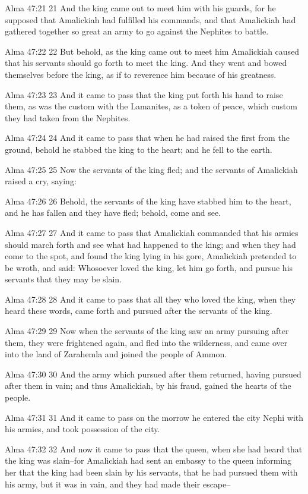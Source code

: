 Alma 47:21
 21 And the king came out to meet him with his guards, for he
supposed that Amalickiah had fulfilled his commands, and that
Amalickiah had gathered together so great an army to go against
the Nephites to battle.

Alma 47:22
 22 But behold, as the king came out to meet him Amalickiah
caused that his servants should go forth to meet the king. And
they went and bowed themselves before the king, as if to
reverence him because of his greatness.

Alma 47:23
 23 And it came to pass that the king put forth his hand to raise
them, as was the custom with the Lamanites, as a token of peace,
which custom they had taken from the Nephites.

Alma 47:24
 24 And it came to pass that when he had raised the first from
the ground, behold he stabbed the king to the heart; and he fell
to the earth.

Alma 47:25
 25 Now the servants of the king fled; and the servants of
Amalickiah raised a cry, saying:

Alma 47:26
 26 Behold, the servants of the king have stabbed him to the
heart, and he has fallen and they have fled; behold, come and
see.

Alma 47:27
 27 And it came to pass that Amalickiah commanded that his armies
should march forth and see what had happened to the king; and
when they had come to the spot, and found the king lying in his
gore, Amalickiah pretended to be wroth, and said: Whosoever loved
the king, let him go forth, and pursue his servants that they may
be slain.

Alma 47:28
 28 And it came to pass that all they who loved the king, when
they heard these words, came forth and pursued after the servants
of the king.

Alma 47:29
 29 Now when the servants of the king saw an army pursuing after
them, they were frightened again, and fled into the wilderness,
and came over into the land of Zarahemla and joined the people of
Ammon.

Alma 47:30
 30 And the army which pursued after them returned, having
pursued after them in vain; and thus Amalickiah, by his fraud,
gained the hearts of the people.

Alma 47:31
 31 And it came to pass on the morrow he entered the city Nephi
with his armies, and took possession of the city.

Alma 47:32
 32 And now it came to pass that the queen, when she had heard
that the king was slain--for Amalickiah had sent an embassy to
the queen informing her that the king had been slain by his
servants, that he had pursued them with his army, but it was in
vain, and they had made their escape--

